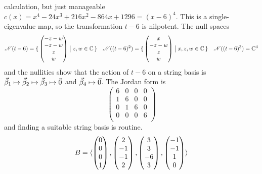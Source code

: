 \begin{exercises}
\begin{answer}
\begin{exparts}
            calculation, but just manageable 
            \( c(x)=x^4-24x^3+216x^2-864x+1296=(x-6)^4 \).
            This is a single-eigenvalue map, so
            the transformation $t-6$ is nilpotent.
            The null spaces
            \begin{equation*}
               \mathscr{N}(t-6)=\mbox{$\{\,\begin{pmatrix} -z-w \\ -z-w \\ z \\ w \end{pmatrix}
                                      \bigm| z,w\in\mathbb{C}\,\}$} 
               \quad
               \mathscr{N}((t-6)^2)=\mbox{$\{\,\begin{pmatrix} x \\ -z-w \\ z \\ w \end{pmatrix}
                                      \bigm| x,z,w\in\mathbb{C}\,\}$} 
               \quad
               \mathscr{N}((t-6)^3)=\mathbb{C}^4 
            \end{equation*}
            and the nullities
            show that the action of $t-6$ on a string basis is
            $\vec{\beta}_1\mapsto\vec{\beta}_2\mapsto
                   \vec{\beta}_3\mapsto\vec{0}$ and
            $\vec{\beta}_4\mapsto\vec{0}$.
            The Jordan form is
            \begin{equation*}
              \begin{pmatrix}
                6  &0  &0  &0  \\
                1  &6  &0  &0  \\
                0  &1  &6  &0  \\
                0  &0  &0  &6  \\
              \end{pmatrix}
            \end{equation*}
            and finding a suitable string basis is routine.
            \begin{equation*}
              B=\sequence{\colvec{0 \\ 0 \\ 0 \\ 1},
                          \colvec{2 \\ -1 \\ -1 \\ 2},
                          \colvec{3 \\ 3 \\ -6 \\ 3},
                          \colvec{-1 \\ -1 \\ 1 \\ 0}}

\end{equation*}
\end{exparts}
\end{answer}
\end{exercises}
